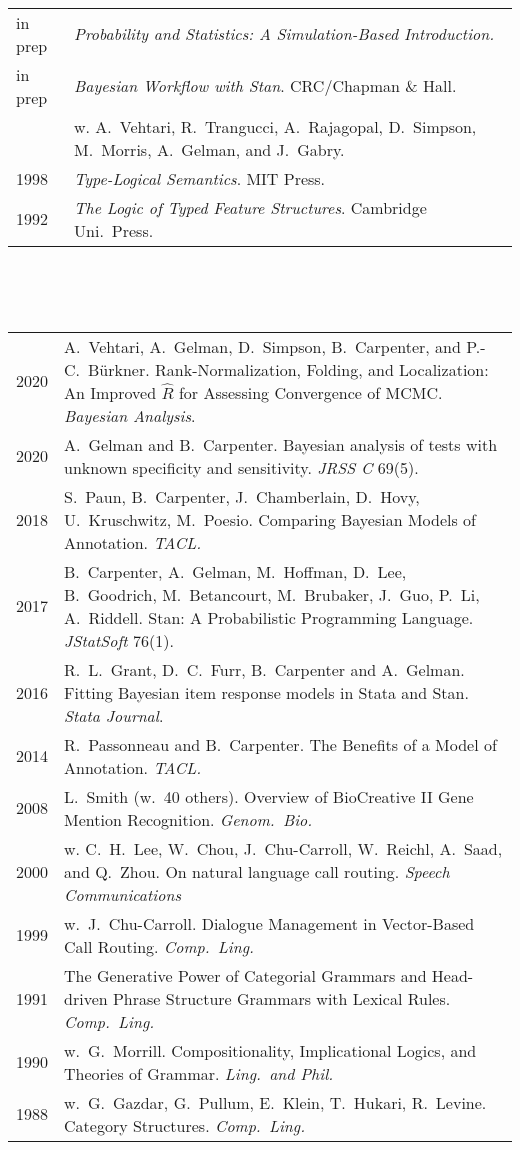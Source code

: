 \documentclass[10pt]{paper}
\newcommand{\heading}[1]{\noindent{\Large\bf\sffamily #1}\\[6pt]}
\newcommand{\publ}[2]{#1 & \begin{minipage}[t]{0.9\textwidth}#2\end{minipage}\\[4pt]}
\begin{document}
\heading{Books}
%
\begin{tabular}{ll}
in prep & {\sl\sffamily Probability and Statistics: A Simulation-Based Introduction.}
\\[6pt]
in prep & {\sl\sffamily Bayesian Workflow with Stan}.
CRC/Chapman \& Hall.
\\[2pt]
&  w. A.~Vehtari, R.~Trangucci, A.~Rajagopal,
               D.~Simpson, M.~Morris, A.~Gelman, and J.~Gabry.
\\[6pt]
1998 & {\sl\sffamily Type-Logical Semantics}. MIT Press.
\\[6pt]
1992 & {\sl\sffamily The Logic of Typed Feature Structures}. Cambridge Uni.\ Press.
\end{tabular}
\\[10pt]


\newpage

\heading{Journal Articles}
\begin{tabular}{ll}
  \publ{2020}{A.~Vehtari, A.~Gelman, D.~Simpson, B.~Carpenter, and
  P.-C.~B\"urkner. Rank-Normalization, Folding, and Localization: An Improved $\widehat{R}$
 for Assessing Convergence of MCMC. {\sl\sffamily Bayesian Analysis}. \vspace*{6pt}}
  \publ{2020}{A.~Gelman and B.~Carpenter.  Bayesian analysis of tests
  with unknown specificity and sensitivity. {\sl\sffamily JRSS C}
  69(5).\vspace*{6pt}}
  \publ{2018}{S.~Paun, B.~Carpenter, J.~Chamberlain, D.~Hovy,
  U.~Kruschwitz, M.~Poesio. Comparing Bayesian Models of
  Annotation. {\sl\sffamily TACL.}\vspace*{6pt}}
\publ{2017}{B.~Carpenter, A.~Gelman, M.~Hoffman, D.~Lee, B.~Goodrich,
  M.~Betancourt, M.~Brubaker, J.~Guo, P.~Li, A.~Riddell. Stan: A
  Probabilistic Programming Language. {\sl\sffamily JStatSoft} 76(1).\vspace*{6pt}}
\publ{2016}{R.~L.~Grant, D.~C.~Furr, B.~Carpenter and  A.~Gelman. Fitting Bayesian item
  response models in Stata and Stan. {\sl\sffamily Stata Journal}.\vspace*{6pt}}
\publ{2014}{R.~Passonneau and B.~Carpenter. The Benefits of a Model of
  Annotation. {\sl\sffamily TACL.}\vspace*{6pt}}
\publ{2008}{L.~Smith (w.\ 40 others). Overview of BioCreative II Gene
  Mention Recognition. {\sl\sffamily Genom.~Bio.}}\vspace*{6pt}
\publ{2000}{w. C.~H.~Lee, W.~Chou, J.~Chu-Carroll, W.~Reichl, A.~Saad,
  and Q.~Zhou.  On natural language call routing. {\sl\sffamily Speech Communications}}
\publ{1999}{w.\ J.\ Chu-Carroll. Dialogue Management in Vector-Based
  Call Routing. {\sl\sffamily Comp.\ Ling.}\vspace*{-2pt}}
\publ{1991}{The Generative Power of Categorial Grammars and
  Head-driven Phrase Structure Grammars with Lexical
  Rules. {\sl\sffamily Comp.\ Ling.}\vspace*{6pt}}
\publ{1990}{w.\ G.\ Morrill. Compositionality, Implicational Logics, and Theories of Grammar. {\sl\sffamily Ling.\ and Phil.}}
\publ{1988}{w.\ G.~Gazdar, G.~Pullum, E.~Klein, T.~Hukari, R.~Levine. Category Structures. {\sl\sffamily Comp.~Ling.}}
\end{tabular}
\vspace*{12pt}
\end{document}

